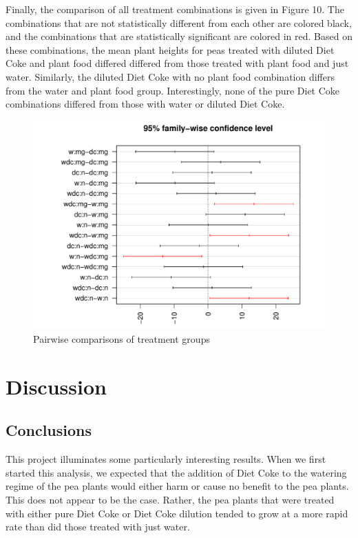 \documentclass[1p,12pt]{elsarticle}\usepackage[]{graphicx}\usepackage[]{color}
\makeatletter
\def\maxwidth{ %
  \ifdim\Gin@nat@width>\linewidth
    \linewidth
  \else
    \Gin@nat@width
  \fi
}
\newenvironment{knitrout}{}{} %
\makeatother
\begin{document}
Finally, the comparison of all treatment combinations is given in Figure 10.  The combinations that are not statistically different from each other are colored black, and the combinations that are statistically significant are colored in red. Based on these combinations, the mean plant heights for peas treated with diluted Diet Coke and plant food differed differed from those treated with plant food and just water. Similarly, the diluted Diet Coke with no plant food combination differs from the water and plant food group. Interestingly, none of the pure Diet Coke combinations differed from those with water or diluted Diet Coke. 

\begin{knitrout}
\color{fgcolor}\begin{figure}

{\centering \includegraphics[width=\maxwidth]{figure/pairwise-1} 

}

\caption[Pairwise comparisons of treatment groups]{Pairwise comparisons of treatment groups}\label{fig:pairwise}
\end{figure}


\end{knitrout}


\section{Discussion}

\subsection{Conclusions}
This project illuminates some particularly interesting results. When we first started this analysis, we expected that the addition of Diet Coke to the watering regime of the pea plants would either harm or cause no benefit to the pea plants. This does not appear to be the case. Rather, the pea plants that were treated with either pure Diet Coke or Diet Coke dilution tended to grow at a more rapid rate than did those treated with just water. 
\end{document}
